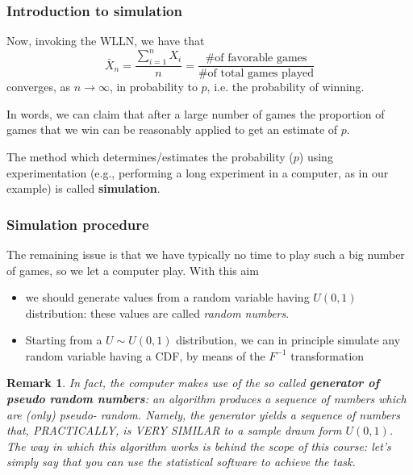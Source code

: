 \documentclass[notes=show,smaller,handout]{beamer}
\newtheorem{remark}{Remark}[section]
\begin{document}
\begin{frame}
\frametitle{Introduction to simulation}
Now, invoking the WLLN, we have that
$$
\bar{X}_n = \frac{\sum_{i=1}^n X_i}{n} = \frac{\text{\# of favorable games}}{\text{\# of total games played}}
$$
converges, as $n \to \infty$, in probability to $p$, i.e. the probability of winning. \pause \\

\vspace{0.4cm}

In words, we can claim that after a large number of games the proportion
of games that we win can be reasonably applied to get an estimate of $p$. 
\vspace{0.4cm}

\begin{definition} 
The method which determines/estimates the probability ($p$) using experimentation (e.g., performing a long experiment in a computer, as in our example) is called \textbf{simulation}.
\end{definition} 


\end{frame}



\begin{frame}
\frametitle{Simulation procedure}

The remaining issue is that we have typically no
time to play such a big number of games, so we let a computer play. 
With this aim

\begin{itemize}
\item we should generate values from a random  variable 
having $U(0,1)$ distribution: these values are called \textit{random numbers}. 

\item Starting from a $U \sim U(0,1)$ distribution, we can in principle simulate any random variable having a CDF, by means of the $F^{-1}$ transformation %

\end{itemize}

\begin{remark}
In fact, the computer makes use of the so called \textbf{generator of pseudo random numbers}: an algorithm produces a sequence of numbers which are (only) pseudo-
random. Namely, the generator yields a sequence of numbers that, PRACTICALLY, is VERY SIMILAR to a sample drawn form $U(0,1)$. The way in which this algorithm works is behind the scope of this course: let's simply say that you can use the statistical software to achieve the task. 
\end{remark}



\end{frame}
\end{document}
